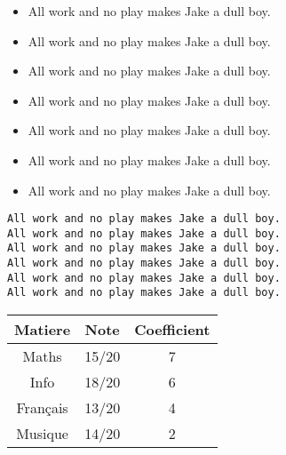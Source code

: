 \documentclass[12pt]{report}
\begin{document}
\begin{itemize}
\item All work and no play makes Jake a dull boy.\\
\item All work and no play makes Jake a dull boy.\\
\item All work and no play makes Jake a dull boy.\\
\item All work and no play makes Jake a dull boy.\\
\item All work and no play makes Jake a dull boy.\\
\item All work and no play makes Jake a dull boy.\\
\item All work and no play makes Jake a dull boy.\\
\end{itemize}
\begin{verbatim}
All work and no play makes Jake a dull boy.
All work and no play makes Jake a dull boy.
All work and no play makes Jake a dull boy.
All work and no play makes Jake a dull boy.
All work and no play makes Jake a dull boy.
All work and no play makes Jake a dull boy.
\end{verbatim}

\bigbreak

\begin{center}
  \begin{tabular}{|c|c|c|}
    \hline
    Matiere & Note & Coefficient\\
    \hline
    Maths & 15/20 & 7 \\
    Info & 18/20 & 6 \\
    Français & 13/20 & 4 \\
    Musique & 14/20 & 2 \\
    \hline
  \end{tabular}
\end{center}
\end{document}
